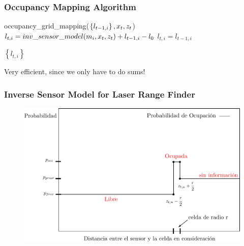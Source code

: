     \begin{frame}
    \frametitle{Occupancy Mapping Algorithm}
    
    \begin{algorithmic}[1]
    \State occupancy\_grid\_mapping($\left\lbrace l_{t-1,i} \right\rbrace, x_{t}, z_{t}$)
    \State $l_{t,i} = inv\_sensor\_model(m_{i}, x_{t}, z_{t}) + l_{t-1,i} - l_{0}$
    \Else
    \State $l_{t,i} = l_{t-1,i}$
    \EndIf
    \EndFor
    
    \State \Return $\left\lbrace l_{t,i} \right\rbrace$
    \end{algorithmic}
    Very efficient, since we only have to do sums!
    
    \end{frame}
    
    \begin{frame}
    \frametitle{Inverse Sensor Model for Laser Range Finder}
    
    \begin{figure}[!h]
    \includegraphics[width=0.8\columnwidth]{./images/inverse_senor_model_range_finder.pdf}
    \end{figure}
    
    \end{frame}
    
